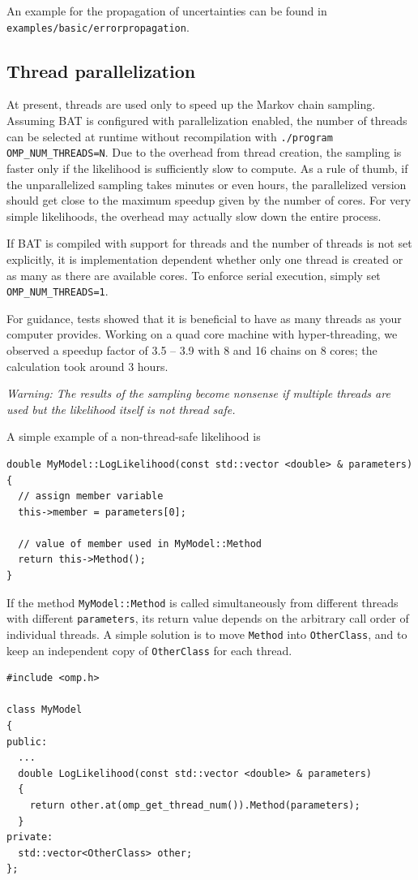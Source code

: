 \documentclass[11pt, a4paper]{article}
\begin{document}
An example for the propagation of uncertainties can be found in
\linebreak \verb|examples/basic/errorpropagation|.


\subsection{Thread parallelization}\label{subsection:thread-par}

At present, threads are used only to speed up the Markov chain
sampling.  Assuming BAT is configured with parallelization enabled,
the number of threads can be selected at runtime without recompilation
with \verb|./program OMP_NUM_THREADS=N|.  Due to the overhead from
thread creation, the sampling is faster only if the likelihood is
sufficiently slow to compute. As a rule of thumb, if the
unparallelized sampling takes minutes or even hours, the parallelized
version should get close to the maximum speedup given by the number of
cores. For very simple likelihoods, the overhead may actually slow
down the entire process.

If BAT is compiled with support for threads and the number of threads
is not set explicitly, it is implementation dependent whether only one
thread is created or as many as there are available cores. To enforce serial execution, simply set \verb|OMP_NUM_THREADS=1|.

For guidance, tests showed that it is beneficial to have as many threads as your
computer provides. Working on a quad core machine with hyper-threading, we
observed a speedup factor of 3.5 -- 3.9 with 8 and 16 chains on 8 cores; the
calculation took around 3 hours.

\emph{Warning: The results of the sampling become nonsense if multiple threads
are used but the likelihood itself is not thread safe.}

A simple example of a non-thread-safe likelihood is
\begin{verbatim}
double MyModel::LogLikelihood(const std::vector <double> & parameters)
{
  // assign member variable
  this->member = parameters[0];

  // value of member used in MyModel::Method
  return this->Method();
}
\end{verbatim}

If the method \texttt{MyModel::Method} is called simultaneously from
different threads with different \texttt{parameters}, its return value
depends on the arbitrary call order of individual threads.  A simple
solution is to move \texttt{Method} into \texttt{OtherClass}, and to
keep an independent copy of \texttt{OtherClass} for each thread.
\begin{verbatim}
#include <omp.h>

class MyModel
{
public:
  ...
  double LogLikelihood(const std::vector <double> & parameters)
  {
    return other.at(omp_get_thread_num()).Method(parameters);
  }
private:
  std::vector<OtherClass> other;
};

\end{verbatim}
\end{document}
